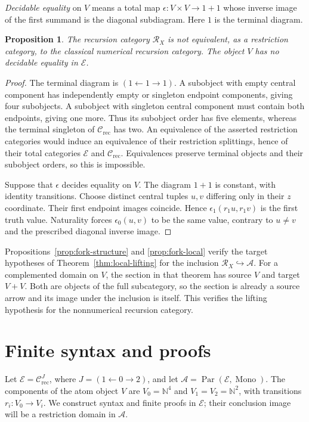\documentclass[11pt]{article}
\newtheorem{proposition}[theorem]{Proposition}
\newcommand{\N}{\mathbb N}
\begin{document}
\emph{Decidable equality} on $V$ means a total map
$\epsilon:V\times V\to1+1$ whose inverse image of the first
summand is the diagonal subdiagram. Here $1$ is the terminal diagram.

\begin{proposition}\label{prop:fork-distinction}
The recursion category $\mathscr R_X$ is not equivalent, as a
restriction category, to the classical numerical recursion category.
The object $V$ has no decidable equality in $\mathcal E$.
\end{proposition}
\begin{proof}
The terminal diagram is $(1\leftarrow1\to1)$. A subobject
with empty central component has independently empty or singleton
endpoint components, giving four subobjects. A subobject with
singleton central component must contain both endpoints, giving
one more. Thus its subobject order has five elements, whereas
the terminal singleton of $\mathcal C_{\mathrm{rec}}$ has two.
An equivalence of the asserted restriction categories would induce
an equivalence of their restriction splittings, hence of their
total categories $\mathcal E$ and $\mathcal C_{\mathrm{rec}}$.
Equivalences preserve terminal objects and their subobject orders,
so this is impossible.

Suppose that $\epsilon$ decides equality on $V$. The diagram $1+1$
is constant, with identity transitions. Choose distinct central
tuples $u,v$ differing only in their $z$ coordinate. Their first
endpoint images coincide. Hence $\epsilon_1(r_1u,r_1v)$ is the
first truth value. Naturality forces $\epsilon_0(u,v)$ to be
the same value, contrary to $u\ne v$ and the prescribed diagonal
inverse image.
\end{proof}

Propositions~\ref{prop:fork-structure} and \ref{prop:fork-local}
verify the target hypotheses of Theorem~\ref{thm:local-lifting}
for the inclusion $\mathscr R_X\hookrightarrow\mathcal A$.
For a complemented domain on $V$, the section in that theorem
has source $V$ and target $V+V$. Both are objects of the full
subcategory, so the section is already a source arrow and its
image under the inclusion is itself. This verifies the lifting
hypothesis for the nonnumerical recursion category.

\section{Finite syntax and proofs}
\label{app:fork-proofs}

Let $\mathcal E=\mathcal C_{\mathrm{rec}}^{J}$, where
$J=(1\leftarrow0\to2)$, and let
$\mathcal A=\operatorname{Par}(\mathcal E,\operatorname{Mono})$.
The components of the atom object $V$ are $V_0=\N^4$ and
$V_1=V_2=\N^2$, with transitions $r_i:V_0\to V_i$.
We construct syntax and finite proofs in $\mathcal E$; their
conclusion image will be a restriction domain in $\mathcal A$.
\end{document}

